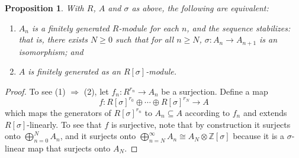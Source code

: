 \documentclass[11pt]{amsart}
\newtheorem{proposition}[equation]{Proposition}
\theoremstyle{definition}
\numberwithin{equation}{subsection} %
\newcommand{\Z}{\mathbb{Z}}
\begin{document}
\begin{proposition} \label{Prop:AlgStability}
With $R$, $A$ and $\sigma$ as above, the following are equivalent:
\begin{enumerate}
\item $A_n$ is a finitely generated $R$-module for each $n$, and the sequence stabilizes: that is, there exists $N\geq 0$ such that for all $n\geq N$, $\sigma:A_n\to A_{n+1}$ is an isomorphism; and
\item $A$ is finitely generated as an $R[\sigma]$-module.
\end{enumerate}
\end{proposition}

\begin{proof}
To see (1) $\Rightarrow$ (2), let $f_n:R^{r_n}\to A_n$ be a surjection. Define a map
$$ f:R[\sigma]^{r_0} \oplus \cdots \oplus R[\sigma]^{r_N} \to A $$
which maps the generators of $R[\sigma]^{r_n}$ to $A_n\subseteq A$ according to $f_n$ and extends $R[\sigma]$-linearly. To see that $f$ is surjective, note that by construction it surjects onto $\bigoplus_{n=0}^N A_n$, and it surjects onto $\bigoplus_{n=N}^\infty A_n \cong A_N \otimes \Z[\sigma]$ because it is a $\sigma$-linear map that surjects onto $A_N$.


\end{proof}
\end{document}
